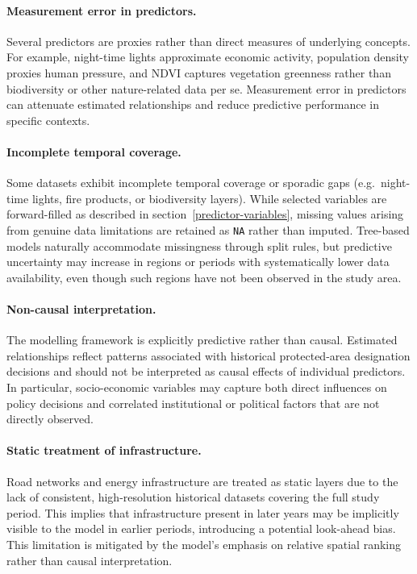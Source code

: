 \documentclass[12pt]{article}
\theoremstyle{break} %
\begin{document}
\paragraph{Measurement error in predictors.}
Several predictors are proxies rather than direct measures of underlying
concepts. For example, night-time lights approximate economic activity, population density proxies human pressure, and NDVI captures vegetation greenness rather than biodiversity or other nature-related data per se. Measurement error in predictors can attenuate estimated relationships and reduce predictive performance in specific contexts.

\paragraph{Incomplete temporal coverage.}
Some datasets exhibit incomplete temporal coverage or sporadic gaps (e.g.\ night-time lights, fire products, or biodiversity layers). While selected variables are forward-filled as described in section~\ref{predictor-variables}, missing values arising from genuine data limitations are retained as \texttt{NA} rather than imputed. Tree-based models naturally accommodate missingness through split rules, but predictive uncertainty may increase in regions or periods with systematically lower data availability, even though such regions have not been observed in the study area.

\paragraph{Non-causal interpretation.}
The modelling framework is explicitly predictive rather than causal. Estimated relationships reflect patterns associated with historical protected-area designation decisions and should not be interpreted as causal effects of individual predictors. In particular, socio-economic variables may capture both direct influences on policy decisions and correlated institutional or political factors that are not directly observed.

\paragraph{Static treatment of infrastructure.} Road networks and energy infrastructure are treated as static layers due to the lack of consistent, high-resolution historical datasets covering the full study period. This implies that infrastructure present in later years may be implicitly visible to the model in earlier periods, introducing a potential look-ahead bias. This limitation is mitigated by the model’s emphasis on relative spatial ranking rather than causal interpretation.
\end{document}
